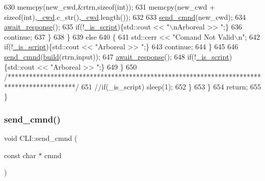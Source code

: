 \begin{DoxyCode}
630             memcpy(new\_cwd,&rtrn,\textcolor{keyword}{sizeof}(\textcolor{keywordtype}{int}));
631             memcpy(new\_cwd + \textcolor{keyword}{sizeof}(\textcolor{keywordtype}{int}),\mbox{\hyperlink{class_c_l_i_a664097f330fa6beaad30f35eb9577ce1}{\_cwd}}.c\_str(),\mbox{\hyperlink{class_c_l_i_a664097f330fa6beaad30f35eb9577ce1}{\_cwd}}.length());
632 
633             \mbox{\hyperlink{class_c_l_i_a1d25fcb18cf42e03a7e38c24a8ba1506}{send\_cmnd}}(new\_cwd);
634             \mbox{\hyperlink{class_c_l_i_a87c68e5edcb5750d1199839e6b1f843e}{await\_response}}();
635             \textcolor{keywordflow}{if}(!\mbox{\hyperlink{class_c_l_i_a93c65474d55597296ddda4739664ea27}{\_is\_script}})\{std::cout << \textcolor{stringliteral}{"\(\backslash\)nArboreal >> "};\}
636             \textcolor{keywordflow}{continue};
637           \}
638         \}
639         \textcolor{keywordflow}{else}
640         \{
641           std::cerr << \textcolor{stringliteral}{"Comand Not Valid\(\backslash\)n"};
642           \textcolor{keywordflow}{if}(!\mbox{\hyperlink{class_c_l_i_a93c65474d55597296ddda4739664ea27}{\_is\_script}})\{std::cout << \textcolor{stringliteral}{"Arboreal >> "};\}
643           \textcolor{keywordflow}{continue};
644         \}
645 
646         \mbox{\hyperlink{class_c_l_i_a1d25fcb18cf42e03a7e38c24a8ba1506}{send\_cmnd}}(\mbox{\hyperlink{class_c_l_i_a6c3f97b04646b070ad82801adf0dc521}{build}}(rtrn,input));
647         \mbox{\hyperlink{class_c_l_i_a87c68e5edcb5750d1199839e6b1f843e}{await\_response}}();
648         \textcolor{keywordflow}{if}(!\mbox{\hyperlink{class_c_l_i_a93c65474d55597296ddda4739664ea27}{\_is\_script}})\{std::cout << \textcolor{stringliteral}{"Arboreal >> "};\}
649       \}
650       \textcolor{comment}{/*******************************************************************************************/}
651       \textcolor{comment}{//if(\_is\_script) sleep(1);}
652     \}
653   \}
654   \textcolor{keywordflow}{return};
655 \}
\end{DoxyCode}
\mbox{\label{class_c_l_i_a1d25fcb18cf42e03a7e38c24a8ba1506}} 
\subsubsection{\texorpdfstring{send\+\_\+cmnd()}{send\_cmnd()}}
{\footnotesize\ttfamily void C\+L\+I\+::send\+\_\+cmnd (\begin{DoxyParamCaption}\item[{const char $\ast$}]{cmnd }\end{DoxyParamCaption})}

